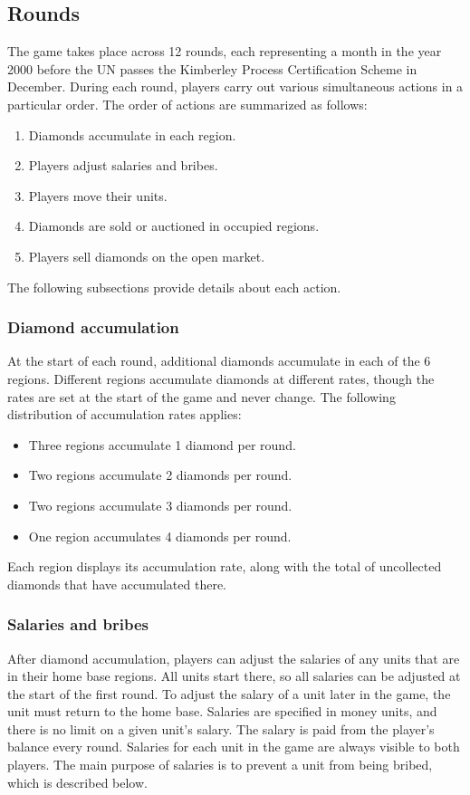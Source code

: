 \documentclass[12pt]{article}
\begin{document}
\subsection{Rounds}

The game takes place across 12 rounds, each representing a month in the year 2000 before the UN passes the Kimberley Process Certification Scheme in December.  During each round, players carry out various simultaneous actions in a particular order.  The order of actions are summarized as follows:
\begin{enumerate}

\item Diamonds accumulate in each region.
\item Players adjust salaries and bribes.
\item Players move their units.
\item Diamonds are sold or auctioned in occupied regions.
\item Players sell diamonds on the open market. 
\end{enumerate}
The following subsections provide details about each action.  


\subsubsection{Diamond accumulation}

At the start of each round, additional diamonds accumulate in each of the 6 regions.  Different regions accumulate diamonds at different rates, though the rates are set at the start of the game and never change.  The following distribution of accumulation rates applies:
\begin{itemize}
\item Three regions accumulate 1 diamond per round.
\item Two regions accumulate 2 diamonds per round.
\item Two regions accumulate 3 diamonds per round.
\item One region accumulates 4 diamonds per round.
\end{itemize}
Each region displays its accumulation rate, along with the total of uncollected diamonds that have accumulated there.


\subsubsection{Salaries and bribes}

After diamond accumulation, players can adjust the salaries of any units that are in their home base regions.  All units start there, so all salaries can be adjusted at the start of the first round.  To adjust the salary of a unit later in the game, the unit must return to the home base.  Salaries are specified in money units, and there is no limit on a given unit's salary.  The salary is paid from the player's balance every round.  Salaries for each unit in the game are always visible to both players.  The main purpose of salaries is to prevent a unit from being bribed, which is described below.
\end{document}
